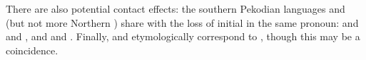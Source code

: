 \documentclass[a4paper]{article}
\begin{document}
	There are also potential contact effects: the southern Pekodian languages \bakairi and \ikpeng (but not more Northern \arara) share with \uxc the loss of initial  in the same pronoun: \arara and \ikpeng {} and   \parencites[72]{alves2017arara}[119]{ikpengpacheco2001}, \bakairi and \uxc {} and   \parencites{meiraDBbakairi}[55]{kuikurodossantos2007}.
Finally, \arara and \ikpeng {}  \parencites{souza1993arara}[119]{ikpengpacheco2001} etymologically correspond to \uxc {} \parencites[55]{kuikurodossantos2007}, though this may be a coincidence.
		
		 
	

	
	\newpage
	\printbibliography
\end{document}
